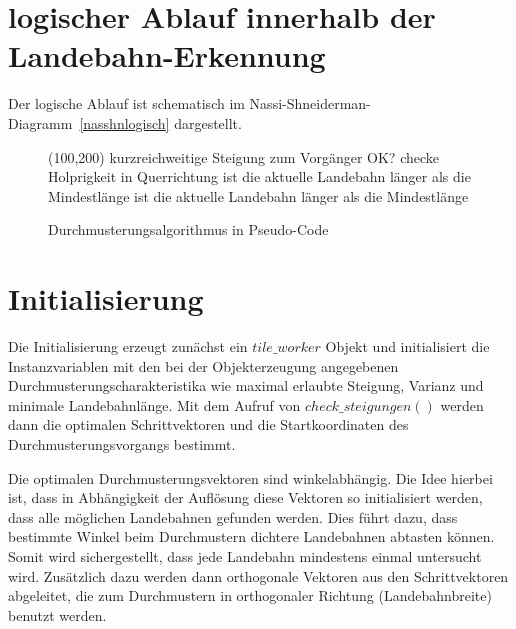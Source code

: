 \documentclass[10pt,a4paper]{report}
\begin{document}
\section{logischer Ablauf innerhalb der Landebahn-Erkennung}

Der logische Ablauf ist schematisch im Nassi-Shneiderman-Diagramm~\ref{nasshnlogisch} dargestellt.

\clearpage
\begin{figure}
\begin{struktogramm}(100,200)
{kurzreichweitige Steigung zum Vorgänger OK?}{\sTrue}{\sFalse}
{checke Holprigkeit in Querrichtung}{\sTrue}{\sFalse}
\change
{}
{ist die aktuelle Landebahn länger als die Mindestlänge}{\sTrue}{\sFalse}
\change
{}
\ifend
\ifend
\change
{}
{ist die aktuelle Landebahn länger als die Mindestlänge}{\sTrue}{\sFalse}
\change
{}
\ifend
{}
\ifend
\forallinend
\end{struktogramm}
\caption{Durchmusterungsalgorithmus in Pseudo-Code}
\end{figure}
\clearpage
\section{Initialisierung}

Die Initialisierung erzeugt zunächst ein $tile\_worker$ Objekt und initialisiert die Instanzvariablen mit den bei der Objekterzeugung angegebenen Durchmusterungscharakteristika wie maximal erlaubte Steigung, Varianz und minimale Landebahnlänge.
Mit dem Aufruf von $check\_steigungen()$ werden dann die optimalen Schrittvektoren und die Startkoordinaten des Durchmusterungsvorgangs bestimmt.

Die optimalen Durchmusterungsvektoren sind winkelabhängig. Die Idee hierbei ist, dass in Abhängigkeit der Auflösung diese Vektoren so initialisiert werden, dass alle möglichen Landebahnen gefunden werden. Dies führt dazu, dass bestimmte Winkel beim Durchmustern dichtere Landebahnen abtasten können. Somit wird sichergestellt, dass jede Landebahn mindestens einmal untersucht wird.
Zusätzlich dazu werden dann orthogonale Vektoren aus den Schrittvektoren abgeleitet, die zum Durchmustern in orthogonaler Richtung (Landebahnbreite) benutzt werden.
\end{document}
